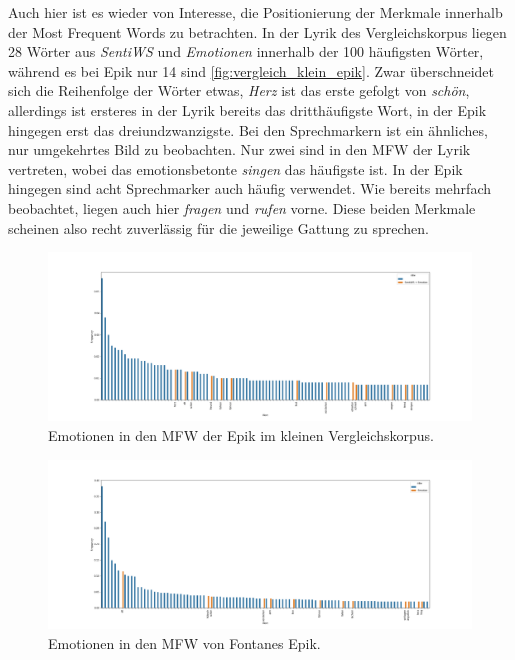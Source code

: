 \documentclass[a4paper,10p]{article}
\begin{document}
Auch hier ist es wieder von Interesse, die Positionierung der Merkmale innerhalb der Most Frequent Words zu betrachten. In der Lyrik des Vergleichskorpus liegen 28 Wörter aus \textit{SentiWS} und \textit{Emotionen} innerhalb der 100 häufigsten Wörter, während es bei Epik nur 14 sind \ref{fig:vergleich_klein_epik}. Zwar überschneidet sich die Reihenfolge der Wörter etwas, \textit{Herz} ist das erste gefolgt von \textit{schön}, allerdings ist ersteres in der Lyrik bereits das dritthäufigste Wort, in der Epik hingegen erst das dreiundzwanzigste. Bei den Sprechmarkern ist ein ähnliches, nur umgekehrtes Bild zu beobachten. Nur zwei sind in den MFW der Lyrik vertreten, wobei das emotionsbetonte \textit{singen} das häufigste ist. In der Epik hingegen sind acht Sprechmarker auch häufig verwendet. Wie bereits mehrfach beobachtet, liegen auch hier \textit{fragen} und \textit{rufen} vorne. Diese beiden Merkmale scheinen also recht zuverlässig für die jeweilige Gattung zu sprechen. \par 

\begin{figure}
		\centering
		\includegraphics[width=\linewidth]{vergleich_epik_sentiemo_mfw.png}
		\caption{Emotionen in den MFW der Epik im kleinen Vergleichskorpus.}
		\label{vergleich_klein_epik}
	\end{figure}

	\begin{figure}
		\centering
		\includegraphics[width=\linewidth]{fontane_epik_sentiws+emotion_mfw.png}
		\caption{Emotionen in den MFW von Fontanes Epik.} 
		\label{fonane_epik}
	\end{figure}
\end{document}
